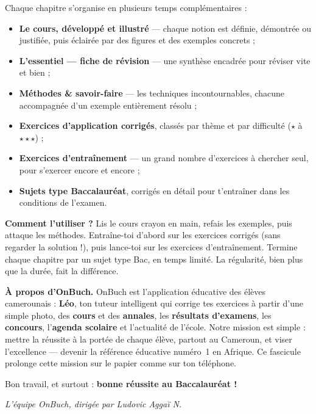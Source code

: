 \medskip
\noindent Chaque chapitre s'organise en plusieurs temps complémentaires :
\begin{itemize}
  \item \textbf{Le cours, développé et illustré} — chaque notion est définie,
        démontrée ou justifiée, puis éclairée par des figures et des exemples concrets ;
  \item \textbf{L'essentiel — fiche de révision} — une synthèse encadrée pour réviser vite et bien ;
  \item \textbf{Méthodes \& savoir-faire} — les techniques incontournables, chacune accompagnée d'un exemple entièrement résolu ;
  \item \textbf{Exercices d'application corrigés}, classés par thème et par difficulté ($\star$ à $\star\star\star$) ;
  \item \textbf{Exercices d'entraînement} — un grand nombre d'exercices à chercher seul, pour s'exercer encore et encore ;
  \item \textbf{Sujets type Baccalauréat}, corrigés en détail pour t'entraîner dans les conditions de l'examen.
\end{itemize}

\medskip
\noindent\textbf{Comment l'utiliser ?} Lis le cours crayon en main, refais les
exemples, puis attaque les méthodes. Entraîne-toi d'abord sur les exercices
corrigés (sans regarder la solution !), puis lance-toi sur les exercices
d'entraînement. Termine chaque chapitre par un sujet type Bac, en temps limité.
La régularité, bien plus que la durée, fait la différence.

\vspace{6pt}
\begin{aretenir}
\textbf{À propos d'OnBuch.} OnBuch est l'application éducative des élèves
camerounais : \textbf{Léo}, ton tuteur intelligent qui corrige tes exercices à
partir d'une simple photo, des \textbf{cours} et des \textbf{annales}, les
\textbf{résultats d'examens}, les \textbf{concours}, l'\textbf{agenda scolaire}
et l'actualité de l'école. Notre mission est simple : mettre la réussite à la
portée de chaque élève, partout au Cameroun, et viser l'excellence — devenir la
référence éducative numéro~1 en Afrique. Ce fascicule prolonge cette mission sur
le papier comme sur ton téléphone.
\end{aretenir}

\medskip
\noindent Bon travail, et surtout : \textbf{bonne réussite au Baccalauréat !}
\par\vspace{8pt}
\hfill{\sffamily\itshape\color{onbmuted} L'équipe OnBuch, dirigée par Ludovic Aggaï N.}
\clearpage

